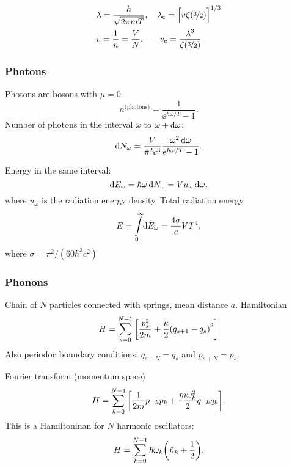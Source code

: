 \documentclass[11pt,letter, swedish, english, twocolumn
]{article}
\newcommand{\lc}{\ensuremath{{\lambda_{\text{c}}}}}
\newcommand{\vc}{\ensuremath{{v_{\text{c}}}}}
\begin{document}
\begin{equation}
\begin{aligned}
&\lambda=\frac{h}{\sqrt{2\pi mT}}\qcomma 
\lc=\Big[v\zeta(\nicefrac{3}{2})\Big]^{1/3}\\
&v=\frac{1}{n}=\frac{V}{N},\hspace{18pt}
\vc=\frac{\lambda^3}{\zeta(\nicefrac{3}{2})}
\end{aligned}
\end{equation}


\subsubsection{Photons}
Photons are bosons with $\mu=0$.
\begin{equation}
n^{\text{(photons)}}=\frac{1}{\ee^{\hbar\omega/T}-1}.
\end{equation}
Number of photons in the interval $\omega$ to $\omega+\mathrm{d}\omega$:
\begin{equation}
\mathrm{d} N_\omega=\frac{V}{\pi^2c^3}\frac{\omega^2\,\mathrm{d}\omega}{\mathrm{e}^{\hbar\omega/T}-1}.
\end{equation}

Energy in the same interval:
\begin{equation}
\mathrm{d} E_\omega=\hbar\omega\,\mathrm{d}{N_\omega}=Vu_\omega\,\mathrm{d}\omega,
\end{equation}
where $u_\omega$ is the radiation energy density.
Total radiation energy
\begin{equation}
E=\int_0^\infty\!\rd E_\omega = \frac{4\sigma}{c}VT^4,
\end{equation}
where $\sigma=\pi^2/(60\hbar^3c^2)$


\subsubsection{Phonons}
Chain of $N$ particles connected with springs, mean distance
$a$. Hamiltonian 
\begin{equation}
H=\sum_{s=0}^{N-1}\qty[\frac{p_s^2}{2m}+\frac{\kappa}{2}\qty(q_{s+1}-q_s)^2]
\end{equation}
Also periodoc boundary conditions: $q_{s+N}=q_s$ and $p_{s+N}=p_s$.

Fourier transform (momentum space)
\begin{equation}
H=\sum_{k=0}^{N-1}\qty[\frac{1}{2m}p_{-k}p_{k}+\frac{m\omega_k^2}{2}q_{-k}q_{k}].
\end{equation}
This is a Hamiltoninan for $N$ harmonic oscillators:
\begin{equation}
H=\sum_{k=0}^{N-1}\hbar\omega_k\qty(\hat{n}_k+\frac{1}{2}).
\end{equation}
\end{document}
